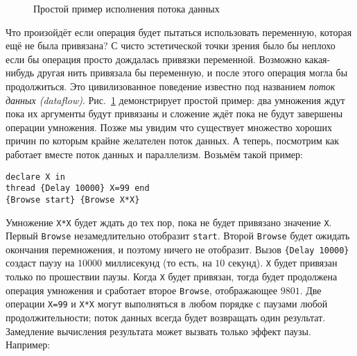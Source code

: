 \begin{figure}
\caption{Простой пример исполнения потока данных}
\label{figure:Dataflow_execution_simple_example}
\end{figure}
Что произойдёт если операция будет пытаться использовать переменную, которая ещё не была привязана? С чисто эстетической точки зрения было бы неплохо если бы операция просто дождалась привязки переменной. Возможно какая-нибудь другая нить привязала бы переменную, и после этого операция могла бы продолжиться. Это цивилизованное поведение известно под названием \emph{поток данных (dataflow)}. Рис.~\ref{figure:Dataflow_execution_simple_example} демонстрирует простой пример: два умножения ждут пока их аргументы будут привязаны и сложение ждёт пока не будут завершены операции умножения. Позже мы увидим что существует множество хороших причин по которым крайне желателен поток данных. А теперь, посмотрим как работает вместе поток данных и параллелизм. Возьмём такой пример:

\begin{lstlisting}
declare X in
thread {Delay 10000} X=99 end
{Browse start} {Browse X*X}
\end{lstlisting}

Умножение \lstinline|X*X| будет ждать до тех пор, пока не будет привязано значение \lstinline|X|. Первый \lstinline|Browse| незамедлительно отобразит \lstinline|start|. Второй \lstinline|Browse| будет ожидать окончания перемножения, и поэтому ничего не отобразит. Вызов \lstinline|{Delay 10000}| создаст паузу на $10000$ миллисекунд (то есть, на $10$ секунд). \lstinline|X| будет привязан только по прошествии паузы. Когда \lstinline|X| будет привязан, тогда будет продолжена операция умножения и сработает второе \lstinline|Browse|, отображающее $9801$. Две операции \lstinline|X=99| и \lstinline|X*X| могут выполняться в любом порядке с паузами любой продолжительности; поток данных всегда будет возвращать один результат. Замедление вычисления результата может вызвать только эффект паузы. Например:

